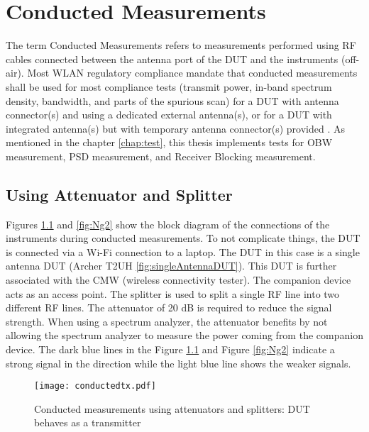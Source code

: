 \chapter{Conducted Measurements} \label{chap:5}

The term Conducted Measurements refers to measurements performed using \acs{RF} cables connected between the antenna port of the \acs{DUT} and the instruments (off-air). Most \acs{WLAN} regulatory compliance mandate that conducted measurements shall be used for most compliance tests (transmit power, in-band spectrum density, bandwidth, and parts of the spurious scan) for a \acs{DUT} with antenna connector(s) and using a dedicated external antenna(s), or for a \acs{DUT} with integrated antenna(s) but with temporary antenna connector(s) provided \cite{conducted}. As mentioned in the chapter \ref{chap:test}, this thesis implements tests for \acf{OBW} measurement, \acf{PSD} measurement, and Receiver Blocking measurement.

\section{Using Attenuator and Splitter}
\label{sec:att}
Figures \ref{fig:Ng1} and \ref{fig:Ng2} show the block diagram of the connections of the instruments during conducted measurements. To not complicate things, the \acs{DUT} is connected via a Wi-Fi\texttrademark{} connection to a laptop. The \acs{DUT} in this case is a single antenna \acs{DUT} (Archer T2UH \ref{fig:singleAntennaDUT}). This \acs{DUT} is further associated with the \ac{CMW} (wireless connectivity tester). The companion device acts as an access point. The splitter is used to split a single \acs{RF} line into two different \acs{RF} lines. The attenuator of 20 dB is required to reduce the signal strength. When using a spectrum analyzer, the attenuator benefits by not allowing the spectrum analyzer to measure the power coming from the companion device. The dark blue lines in the Figure \ref{fig:Ng1} and Figure \ref{fig:Ng2} indicate a strong signal in the direction while the light blue line shows the weaker signals. 

\begin{figure}[H]
\centering
\texttt{[image: conductedtx.pdf]}
\vspace{-0.5cm}  \caption{Conducted measurements using attenuators and splitters: \acs{DUT} behaves as a transmitter}
 \label{fig:Ng1} 
\end{figure}

